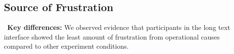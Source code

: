 





%


\subsection{Source of Frustration} 
\label{sec:frustration}

\begin{tldrbox}
   \faKey~\textbf{Key differences:} We observed evidence that participants in the long text interface showed the least amount of frustration from operational causes compared to other experiment conditions.%
\end{tldrbox}

